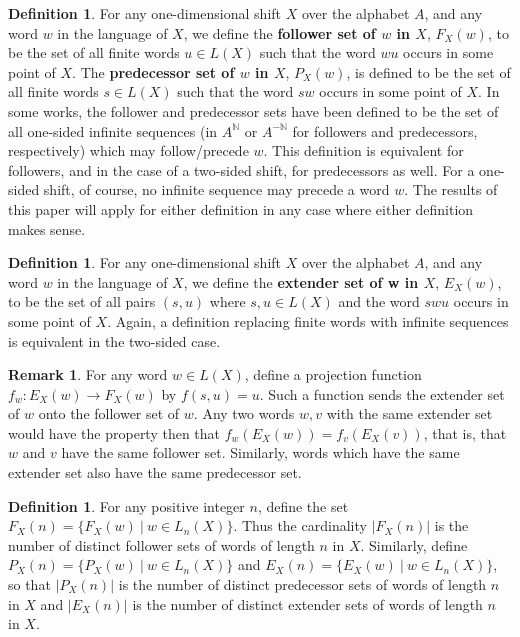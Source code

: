 \documentclass{amsart}
\theoremstyle{definition}
\newtheorem{definition}[theorem]{Definition}
\newtheorem{remark}[theorem]{Remark}
\numberwithin{equation}{section}
\begin{document}
\begin{definition}
For any one-dimensional shift $X$ over the alphabet $A$, and any word $w$ in the language of $X$, we define the \textbf{follower set of $w$ in $X$}, $F_X(w)$, to be the set of all finite words $u \in L(X)$ such that the word $wu$ occurs in some point of $X$. The \textbf{predecessor set of $w$ in $X$}, $P_X(w)$, is defined to be the set of all finite words $s \in L(X)$ such that the word $sw$ occurs in some point of $X$. In some works, the follower and predecessor sets have been defined to be the set of all one-sided infinite sequences (in $A^{\mathbb{N}}$ or $A^{-\mathbb{N}}$ for followers and predecessors, respectively) which may follow/precede $w$. This definition is equivalent for followers, and in the case of a two-sided shift, for predecessors as well. For a one-sided shift, of course, no infinite sequence may precede a word $w$. The results of this paper will apply for either definition in any case where either definition makes sense.
\end{definition}

\begin{definition}
For any one-dimensional shift $X$ over the alphabet $A$, and any word $w$ in the language of $X$, we define the \textbf{extender set of w in $X$}, $E_X(w)$, to be the set of all pairs $(s, u)$ where $s, u \in L(X)$ and the word $swu$ occurs in some point of $X$. Again, a definition replacing finite words with infinite sequences is equivalent in the two-sided case.
\end{definition}

\begin{remark}
For any word $w \in L(X)$, define a projection function $f_w:E_X(w) \rightarrow F_X(w)$ by $f(s,u) = u$. Such a function sends the extender set of $w$ onto the follower set of $w$. Any two words $w, v$ with the same extender set would have the property then that $f_w(E_X(w))= f_v(E_X(v))$, that is, that $w$ and $v$ have the same follower set. Similarly, words which have the same extender set also have the same predecessor set.
\end{remark}

\begin{definition}
For any positive integer $n$, define the set $F_X(n) = \{F_X(w) \ | \ w \in L_{n}(X)\}$. Thus the cardinality $|F_X(n)|$ is the number of distinct follower sets of words of length $n$ in $X$. Similarly, define $P_X(n) = \{P_X(w) \ | \ w \in L_n(X)\}$ and $E_X(n) = \{E_X(w) \ | \ w \in L_n(X)\}$, so that $|P_X(n)|$ is the number of distinct predecessor sets of words of length $n$ in $X$ and $|E_X(n)|$ is the number of distinct extender sets of words of length $n$ in $X$.
\end{definition}
\end{document}
